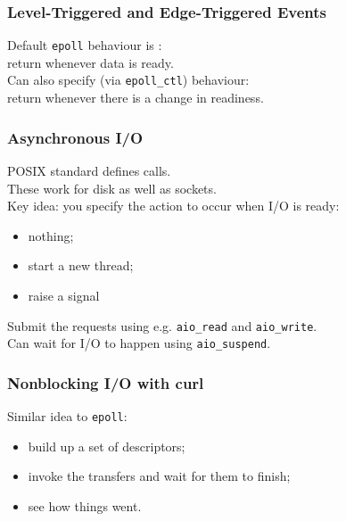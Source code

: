 \begin{frame}
  \frametitle{Level-Triggered and Edge-Triggered Events}
  
    Default {\tt epoll} behaviour is :\\
    \quad return whenever data is ready.\\[1em]

    Can also specify (via {\tt epoll\_ctl})  behaviour:\\
    \quad return whenever there is a change in readiness.\\[1em]
  
\end{frame}


\begin{frame}
  \frametitle{Asynchronous I/O}
  
    POSIX standard defines  calls.\\[1em]

    These work for disk as well as sockets.\\[1em]

    Key idea: you specify the action to occur when I/O is ready:
    \begin{itemize}
      \item nothing;
      \item start a new thread;
      \item raise a signal
    \end{itemize}

    Submit the requests using e.g. {\tt aio\_read} and {\tt aio\_write}.\\[1em]
    Can wait for I/O to happen using {\tt aio\_suspend}.
  
\end{frame}

\begin{frame}
  \frametitle{Nonblocking I/O with curl}
  
    Similar idea to {\tt epoll}:
\begin{itemize}
\item build up a set of descriptors;
\item invoke the transfers and wait for them to finish;
\item see how things went.
\end{itemize}
  
\end{frame}

